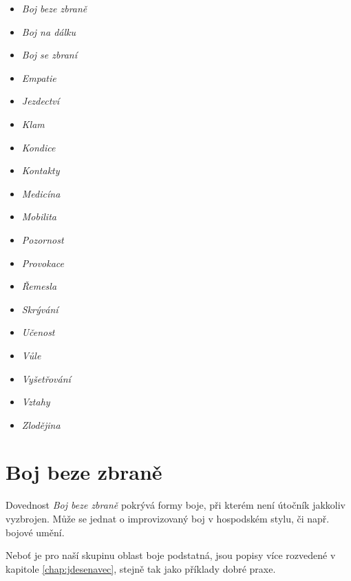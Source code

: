 \documentclass[../main.tex]{subfiles}
\begin{document}
\begin{multicols}{2}
\begin{itemize}
\item \textit{Boj beze zbraně}
\item \textit{Boj na dálku}
\item \textit{Boj se zbraní}
\item \textit{Empatie}
\item \textit{Jezdectví}
\item \textit{Klam}
\item \textit{Kondice}
\item \textit{Kontakty}
\item \textit{Medicína}
\item \textit{Mobilita}
\item \textit{Pozornost}
\item \textit{Provokace}
\item \textit{Řemesla}
\item \textit{Skrývání}
\item \textit{Učenost}
\item \textit{Vůle}
\item \textit{Vyšetřování}
\item \textit{Vztahy}
\item \textit{Zlodějina}
\end{itemize}
\end{multicols}


\section{Boj beze zbraně}
\label{sec:bojbezezbrane}

Dovednost \textit{Boj beze zbraně} pokrývá formy boje, při kterém není útočník jakkoliv vyzbrojen. Může se jednat o improvizovaný boj v hospodském stylu, či např. bojové umění.

Neboť je pro naší skupinu oblast boje podstatná, jsou popisy více rozvedené v kapitole \ref{chap:jdesenavec}, stejně tak jako příklady dobré praxe.\\
   
\end{document}
